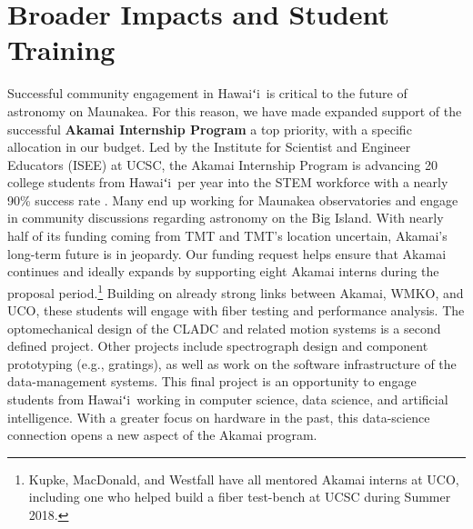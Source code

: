 \documentclass[oneside,11pt]{amsart}
\newcommand{\hawaii}{Hawaiʻi}
\begin{document}


\section{Broader Impacts and Student Training}
\label{sec:bi}



Successful community engagement in \hawaii\ is critical to the future of astronomy on Maunakea.  For this reason, we have made expanded support of the successful \textbf{Akamai Internship Program} a top priority, with a specific allocation in our budget. Led by the Institute for Scientist and Engineer Educators (ISEE) at UCSC, the Akamai Internship Program is advancing 20 college students from \hawaii\ per year into the STEM workforce with a nearly 90\% success rate \citep{asee_peer_31030}.  Many end up working for Maunakea observatories and engage in community discussions regarding astronomy on the Big Island.  With nearly half of its funding coming from TMT and TMT's location uncertain, Akamai's long-term future is in jeopardy.  Our funding request helps ensure that Akamai continues and ideally expands by supporting eight Akamai interns during the proposal period.\footnote{Kupke, MacDonald, and Westfall have all mentored Akamai interns at UCO, including one who helped build a fiber test-bench at UCSC during Summer 2018.} Building on already strong links between Akamai, WMKO, and UCO, these students will engage with fiber testing and performance analysis. The optomechanical design of the CLADC and related motion systems is a second defined project.  Other projects include spectrograph design and component prototyping (e.g., gratings), as well as work on the software infrastructure of the data-management systems.  This final project is an opportunity to engage students from \hawaii\ working in computer science, data science, and artificial intelligence.  With a greater focus on hardware in the past, this data-science connection opens a new aspect of the Akamai program. 
\end{document}
